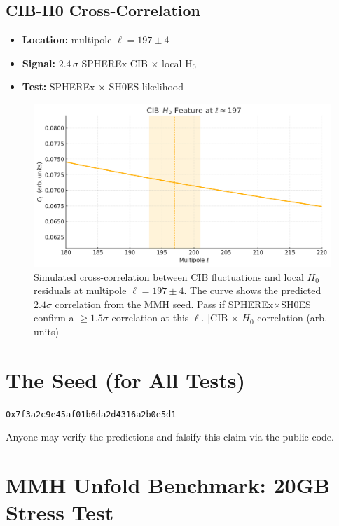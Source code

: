\documentclass[11pt,a4paper]{article}
\newcommand{\SeedHex}{\texttt{0x7f3a2c9e45af01b6da2d4316a2b0e5d1}}
\begin{document}
\subsection{CIB-H0 Cross-Correlation}
\begin{itemize}
  \item \textbf{Location:} multipole $\ell = 197 \pm 4$
  \item \textbf{Signal:} $2.4\,\sigma$ SPHEREx CIB $\times$ local H$_0$
  \item \textbf{Test:} SPHEREx $\times$ SH0ES likelihood
\end{itemize}
\FloatBarrier
\begin{figure}[htbp]
  \centering
  \includegraphics[width=0.75\linewidth]{figs/cib_h0_corr.png}
  \caption{Simulated cross-correlation between CIB fluctuations and local $H_0$ residuals at multipole $\ell = 197 \pm 4$. The curve shows the predicted $2.4\sigma$ correlation from the MMH seed. Pass if SPHEREx$\times$SH0ES confirm a $\geq 1.5\sigma$ correlation at this $\ell$. [CIB $\times$ $H_0$ correlation (arb. units)]}
  \label{fig:cib_correlation}
\end{figure}
\FloatBarrier

\FloatBarrier
\section{The Seed (for All Tests)}
\begin{center}
\SeedHex
\end{center}
Anyone may verify the predictions and falsify this claim via the public code.

\FloatBarrier
\section{MMH Unfold Benchmark: 20GB Stress Test}
\end{document}
